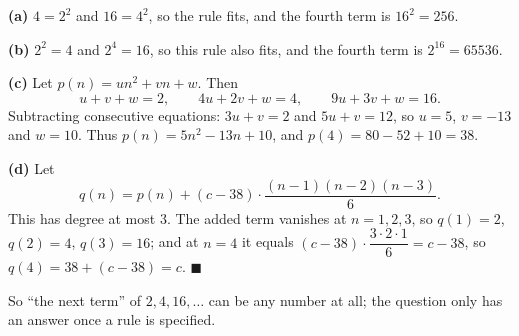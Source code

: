 \textbf{(a)} $4=2^2$ and $16=4^2$, so the rule fits, and the fourth term is $16^2=\boxed{256}$.

\textbf{(b)} $2^2=4$ and $2^4=16$, so this rule also fits, and the fourth term is $2^{16}=\boxed{65536}$.

\textbf{(c)} Let $p(n)=un^2+vn+w$. Then
\[u+v+w=2,\qquad4u+2v+w=4,\qquad9u+3v+w=16.\]
Subtracting consecutive equations: $3u+v=2$ and $5u+v=12$, so $u=5$, $v=-13$ and $w=10$. Thus $p(n)=5n^2-13n+10$, and $p(4)=80-52+10=\boxed{38}$.

\textbf{(d)} Let
\[q(n)=p(n)+(c-38)\cdot\dfrac{(n-1)(n-2)(n-3)}{6}.\]
This has degree at most $3$. The added term vanishes at $n=1,2,3$, so $q(1)=2$, $q(2)=4$, $q(3)=16$; and at $n=4$ it equals $(c-38)\cdot\dfrac{3\cdot2\cdot1}{6}=c-38$, so $q(4)=38+(c-38)=c$. $\blacksquare$

So ``the next term'' of $2,4,16,\dots$ can be any number at all; the question only has an answer once a rule is specified.
